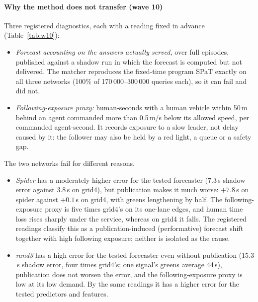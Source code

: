 \paragraph{Why the method does not transfer (wave 10)} Three registered diagnostics, each with a reading fixed in advance
(Table~\ref{tab:w10}):
\begin{itemize}\setlength\itemsep{1pt}
\item \emph{Forecast accounting on the answers actually served,} over full episodes, published against a shadow run in which the forecast
is computed but not delivered. The matcher reproduces the fixed-time program SPaT exactly on all three networks (100\% of 170\,000--300\,000
queries each), so it can fail and did not.
\item \emph{Following-exposure proxy:} human-seconds with a human vehicle within 50\,m behind an agent commanded more than 0.5\,m/s below
its allowed speed, per commanded agent-second. It records exposure to a slow leader, not delay caused by it: the follower may also be held
by a red light, a queue or a safety gap.
\end{itemize}
The two networks fail for different reasons.
\begin{itemize}\setlength\itemsep{1pt}
\item \emph{Spider} has a moderately higher error for the tested forecaster ($7.3$\,s shadow error against $3.8$\,s on grid4), but publication makes it much
worse: $+7.8$\,s on spider against $+0.1$\,s on grid4, with greens lengthening by half. The following-exposure proxy is five times grid4's
on its one-lane edges, and human time loss rises sharply under the service, whereas on grid4 it falls. The registered readings classify
this as a publication-induced (performative) forecast shift together with high following exposure; neither is isolated as the cause.
\item \emph{rand3} has a high error for the tested forecaster even without publication ($15.3$\,s shadow error, four times grid4's; one signal's greens average
44\,s), publication does not worsen the error, and the following-exposure proxy is low at its low demand. By the same readings it has a higher error for the
tested predictors and features.
\end{itemize}
